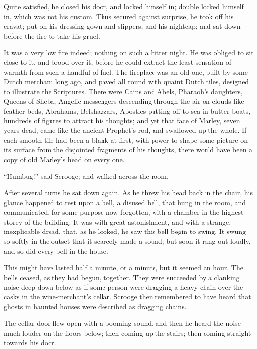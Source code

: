 \documentclass[paper=5.5in:8.5in,BCOR=7mm,twoside,DIV=calc,12pt,usegeometry]{scrbook} %
\begin{document}
Quite satisfied, he closed his door, and locked himself in; double locked himself in, which was not his custom. Thus secured against surprise, he took off his cravat; put on his dressing-gown and slippers, and his nightcap; and sat down before the fire to take his gruel.

It was a very low fire indeed; nothing on such a bitter night. He was obliged to sit close to it, and brood over it, before he could extract the least sensation of warmth from such a handful of fuel. The fireplace was an old one, built by some Dutch merchant long ago, and paved all round with quaint Dutch tiles, designed to illustrate the Scriptures. There were Cains and Abels, Pharaoh's daughters, Queens of Sheba, Angelic messengers descending \newline through the air on clouds like feather-beds, Abrahams, Belshazzars, Apostles putting off to sea in butter-boats, hundreds of figures to attract his thoughts; and yet that face of Marley, seven years dead, came like the ancient Prophet's rod, and swallowed up the whole. If each smooth tile had been a blank at first, with power to shape some picture on its surface from the disjointed fragments of his thoughts, there would have been a copy of old Marley's head on every one.

\enquote{Humbug!} said Scrooge; and walked across the room.

After several turns he sat down again. As he threw his head back in the chair, his glance happened to rest upon a bell, a disused bell, that hung in the room, and communicated, for some purpose now forgotten, with a chamber in the highest storey of the building. It was with great astonishment, and with a strange, inexplicable dread, that, as he looked, he saw this bell begin to swing. It swung so softly in the outset that it scarcely made a sound; but soon it rang out loudly, and so did every bell in the house.

This might have lasted half a minute, or a minute, but it seemed an hour. The bells ceased, as they had begun, together. They were succeeded by a clanking noise deep down below as if some person were dragging a heavy chain over the casks in the wine-merchant's cellar. Scrooge then remembered to have heard that ghosts in haunted houses were described as dragging chains.

The cellar door flew open with a booming sound, and then he heard the noise much louder on the floors below; then coming up the stairs; then coming straight towards his door.
\end{document}
